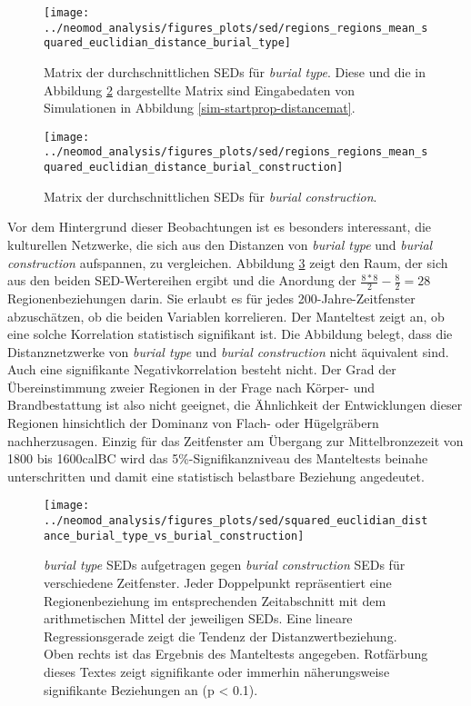 \documentclass[openany,twoside,twocolumn]{book}
\begin{document}
\begin{figure}
\texttt{[image: ../neomod\_analysis/figures\_plots/sed/regions\_regions\_mean\_squared\_euclidian\_distance\_burial\_type]} \caption[Matrix der durchschnittlichen SEDs für \textit{burial type}]{Matrix der durchschnittlichen SEDs für \textit{burial type}. Diese und die in Abbildung \ref{fig:sed-mean-matrix-bc} dargestellte Matrix sind Eingabedaten von Simulationen in Abbildung \ref{sim-startprop-distancemat}.}\label{fig:sed-mean-matrix-bt}
\end{figure}

\begin{figure}
\texttt{[image: ../neomod\_analysis/figures\_plots/sed/regions\_regions\_mean\_squared\_euclidian\_distance\_burial\_construction]} \caption[Matrix der durchschnittlichen SEDs für \textit{burial construction}]{Matrix der durchschnittlichen SEDs für \textit{burial construction}.}\label{fig:sed-mean-matrix-bc}
\end{figure}

Vor dem Hintergrund dieser Beobachtungen ist es besonders interessant,
die kulturellen Netzwerke, die sich aus den Distanzen von \emph{burial
type} und \emph{burial construction} aufspannen, zu vergleichen.
Abbildung \ref{fig:mantel-bt-bc} zeigt den Raum, der sich aus den beiden
SED-Wertereihen ergibt und die Anordung der
\(\frac{8*8}{2}-\frac{8}{2}=28\) Regionenbeziehungen darin. Sie erlaubt
es für jedes 200-Jahre-Zeitfenster abzuschätzen, ob die beiden Variablen
korrelieren. Der Manteltest zeigt an, ob eine solche Korrelation
statistisch signifikant ist. Die Abbildung belegt, dass die
Distanznetzwerke von \emph{burial type} und \emph{burial construction}
nicht äquivalent sind. Auch eine signifikante Negativkorrelation besteht
nicht. Der Grad der Übereinstimmung zweier Regionen in der Frage nach
Körper- und Brandbestattung ist also nicht geeignet, die Ähnlichkeit der
Entwicklungen dieser Regionen hinsichtlich der Dominanz von Flach- oder
Hügelgräbern nachherzusagen. Einzig für das Zeitfenster am Übergang zur
Mittelbronzezeit von 1800 bis 1600calBC wird das 5\%-Signifikanzniveau
des Manteltests beinahe unterschritten und damit eine statistisch
belastbare Beziehung angedeutet.

\begin{landscape}
\begin{figure}
\texttt{[image: ../neomod\_analysis/figures\_plots/sed/squared\_euclidian\_distance\_burial\_type\_vs\_burial\_construction]} \caption[\textit{burial type} SEDs aufgetragen gegen \textit{burial construction} SEDs]{\textit{burial type} SEDs aufgetragen gegen \textit{burial construction} SEDs für verschiedene Zeitfenster. Jeder Doppelpunkt repräsentiert eine Regionenbeziehung im entsprechenden Zeitabschnitt mit dem arithmetischen Mittel der jeweiligen SEDs. Eine lineare Regressionsgerade zeigt die Tendenz der Distanzwertbeziehung. Oben rechts ist das Ergebnis des Manteltests angegeben. Rotfärbung dieses Textes zeigt signifikante oder immerhin näherungsweise signifikante Beziehungen an (p < 0.1).}\label{fig:mantel-bt-bc}
\end{figure}
\end{landscape}
\end{document}
